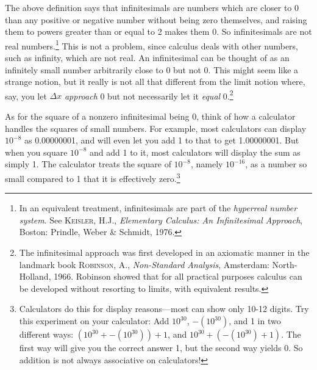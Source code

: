 
The above definition says that infinitesimals are numbers which are closer to 0
than any positive or negative number without being zero themselves, and
raising them to powers greater than or equal to 2 makes them 0. So infinitesimals
are not real numbers.\footnote{In an equivalent treatment, infinitesimals are
part of the \emph{hyperreal number system}. See \textsc{Keisler, H.J.},
\emph{Elementary Calculus: An Infinitesimal Approach}, Boston: Prindle, Weber
\& Schmidt, 1976.} This is not a problem, since calculus deals
with other numbers, such as infinity, which are not real. An infinitesimal can
be thought of as an infinitely small number arbitrarily close to 0 but
not 0.
\newpage
This might seem like a strange notion, but it really is not all that
different from the limit notion where, say, you let $\Delta x$ \emph{approach} 0
but not necessarily let it \emph{equal} 0.\footnote{The infinitesimal approach
was first developed in an
axiomatic manner in the landmark book \textsc{Robinson, A.},
\emph{Non-Standard Analysis}, Amsterdam: North-Holland, 1966. Robinson showed
that for all practical purposes calculus can be developed without resorting to
limits, with equivalent results.}

As for the square of a nonzero infinitesimal being 0, think of how a calculator
handles the squares of small numbers. For example, most calculators can display
$10^{-8}$ as 0.00000001, and will even let you add 1 to that to get
1.00000001. But when you square $10^{-8}$ and add 1 to it, most calculators will
display the sum as simply 1. The calculator treats the square of $10^{-8}$,
namely $10^{-16}$, as a number so small compared to 1 that it is
effectively zero.\footnote{Calculators do this for display reasons---most
can show only 10-12 digits. Try this experiment on your
calculator: Add $10^{30}$, $-\left(10^{30}\right)$, and 1 in two different
ways: $\left(10^{30} + -\left(10^{30}\right)\right) + 1$, and $10^{30} +
\left(-\left(10^{30}\right) + 1\right)$. The first way will give you the correct
answer 1, but the second way yields 0.
So addition is not always associative on calculators!}

